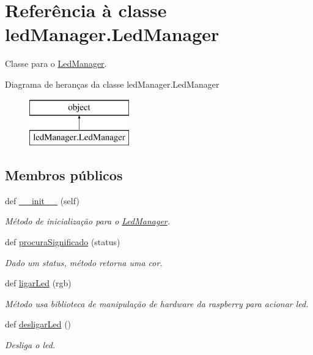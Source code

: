 \hypertarget{classled_manager_1_1_led_manager}{}\section{Referência à classe led\+Manager.\+Led\+Manager}
\label{classled_manager_1_1_led_manager}


Classe para o \hyperlink{classled_manager_1_1_led_manager}{Led\+Manager}.  


Diagrama de heranças da classe led\+Manager.\+Led\+Manager\begin{figure}[H]
\begin{center}
\leavevmode
\includegraphics[height=2.000000cm]{classled_manager_1_1_led_manager}
\end{center}
\end{figure}
\subsection*{Membros públicos}
\begin{DoxyCompactItemize}
\item 
def \hyperlink{classled_manager_1_1_led_manager_a5bc4f172c79144377da875a1290a7dbd}{\+\_\+\+\_\+init\+\_\+\+\_\+} (self)
\begin{DoxyCompactList}\small\item\em Método de inicialização para o \hyperlink{classled_manager_1_1_led_manager}{Led\+Manager}. \end{DoxyCompactList}\item 
def \hyperlink{classled_manager_1_1_led_manager_ace03fe1a941d4b5f4d7e9d3c47964e36}{procura\+Significado} (status)
\begin{DoxyCompactList}\small\item\em Dado um {\ttfamily status}, método retorna uma cor. \end{DoxyCompactList}\item 
def \hyperlink{classled_manager_1_1_led_manager_aa6376276d32605b1958f941a05ed0a3d}{ligar\+Led} (rgb)
\begin{DoxyCompactList}\small\item\em Método usa biblioteca de manipulação de hardware da raspberry para acionar led. \end{DoxyCompactList}\item 
def \hyperlink{classled_manager_1_1_led_manager_a14e59e953d64be5fe1e58e7ecbfdbe7c}{desligar\+Led} ()
\begin{DoxyCompactList}\small\item\em Desliga o led. \end{DoxyCompactList}\end{DoxyCompactItemize}
